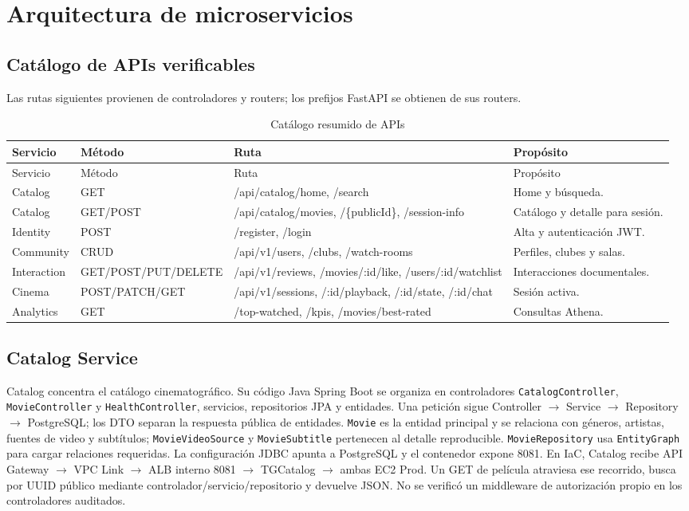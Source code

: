 \chapter{Arquitectura de microservicios}
\section{Catálogo de APIs verificables}Las rutas siguientes provienen de controladores y routers; los prefijos FastAPI se obtienen de sus routers.
\begin{longtable}{p{}p{}p{}p{}}\caption{Catálogo resumido de APIs}\toprule Servicio&Método&Ruta&Propósito\\\midrule\endfirsthead\toprule Servicio&Método&Ruta&Propósito\\\midrule\endhead Catalog&GET&/api/catalog/home, /search&Home y búsqueda.\\Catalog&GET/POST&/api/catalog/movies, /\{publicId\}, /session-info&Catálogo y detalle para sesión.\\Identity&POST&/register, /login&Alta y autenticación JWT.\\Community&CRUD&/api/v1/users, /clubs, /watch-rooms&Perfiles, clubes y salas.\\Interaction&GET/POST/PUT/DELETE&/api/v1/reviews, /movies/:id/like, /users/:id/watchlist&Interacciones documentales.\\Cinema&POST/PATCH/GET&/api/v1/sessions, /:id/playback, /:id/state, /:id/chat&Sesión activa.\\Analytics&GET&/top-watched, /kpis, /movies/best-rated&Consultas Athena.\\\bottomrule\end{longtable}
\section{Catalog Service}
Catalog concentra el catálogo cinematográfico. Su código Java Spring Boot se organiza en controladores \texttt{CatalogController}, \texttt{MovieController} y \texttt{HealthController}, servicios, repositorios JPA y entidades. Una petición sigue Controller $\rightarrow$ Service $\rightarrow$ Repository $\rightarrow$ PostgreSQL; los DTO separan la respuesta pública de entidades. \texttt{Movie} es la entidad principal y se relaciona con géneros, artistas, fuentes de video y subtítulos; \texttt{MovieVideoSource} y \texttt{MovieSubtitle} pertenecen al detalle reproducible. \texttt{MovieRepository} usa \texttt{EntityGraph} para cargar relaciones requeridas. La configuración JDBC apunta a PostgreSQL y el contenedor expone 8081. En IaC, Catalog recibe API Gateway $\rightarrow$ VPC Link $\rightarrow$ ALB interno 8081 $\rightarrow$ TGCatalog $\rightarrow$ ambas EC2 Prod. Un GET de película atraviesa ese recorrido, busca por UUID público mediante controlador/servicio/repositorio y devuelve JSON. No se verificó un middleware de autorización propio en los controladores auditados.
